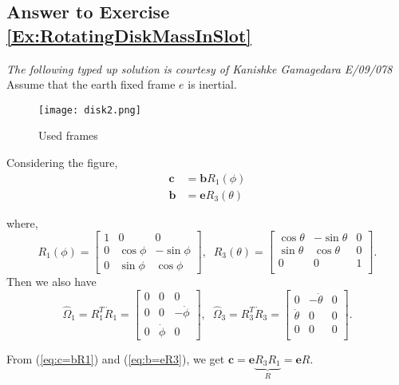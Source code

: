 \documentclass[graybox,envcountchap,sectrefs]{svmonoMuga}
\begin{document}
\subsection*{Answer to Exercise \ref{Ex:RotatingDiskMassInSlot}}
{\it The following typed up solution is courtesy of Kanishke Gamagedara E/09/078}\\

Assume that the earth fixed frame $e$ is inertial.\\

\begin{figure}[hbtp]
  \begin{center}
  \texttt{[image: disk2.png]}
  \caption{Used frames}
  \label{fig:disk2}
  \end{center}
\end{figure}

Considering the figure,
\begin{align}
\mathbf{c}&=\mathbf{b}R_1(\phi) \label{eq:c=bR1}\\
\mathbf{b}&=\mathbf{e}R_3(\theta) \label{eq:b=eR3}
\end{align}

where,
\[R_1(\phi)=
\begin{bmatrix}
1&0&0\\
0 & \cos\phi & -\sin\phi\\
0 & \sin\phi & \cos\phi
\end{bmatrix}, \;\;
R_3(\theta)=
\begin{bmatrix}
\cos\theta & -\sin\theta & 0\\
\sin\theta & \cos\theta & 0\\
0 & 0 & 1\\
\end{bmatrix}.
\]
Then we also have
\[\widehat{\Omega}_1=R_1^T\dot{R}_1=
\begin{bmatrix}
0&0&0\\
0 & 0 & -\dot{\phi}\\
0 & \dot{\phi} & 0
\end{bmatrix}, \;\;
\widehat{\Omega}_3=R_3^T\dot{R}_3=\begin{bmatrix}
0 & -\dot{\theta} & 0\\
\dot{\theta} & 0 & 0\\
0 & 0 & 0\\
\end{bmatrix}.
\]

From (\ref{eq:c=bR1}) and (\ref{eq:b=eR3}), we get
$\mathbf{c}=\mathbf{e}\underbrace{R_3R_1}_{R}=\mathbf{e}R$. 
\end{document}
